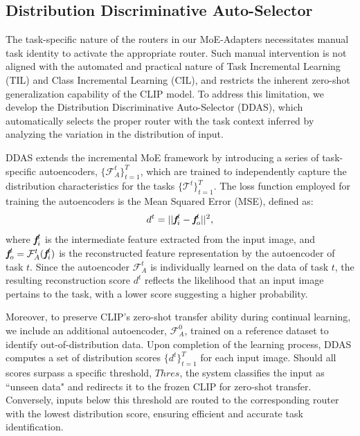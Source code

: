 \subsection{Distribution Discriminative Auto-Selector}
\label{DDAS}
The task-specific nature of the routers in our MoE-Adapters necessitates manual task identity to activate the appropriate router. Such manual intervention is not aligned with the automated and practical nature of Task Incremental Learning (TIL) and Class Incremental Learning (CIL), and restricts the inherent zero-shot generalization capability of the CLIP model. To address this limitation, we develop the Distribution Discriminative Auto-Selector (DDAS), which automatically selects the proper router with the task context inferred by analyzing the variation in the distribution of input.

DDAS extends the incremental MoE framework by introducing a series of task-specific autoencoders, $\{\mathcal{F}_A^t\}_{t=1}^T$, which are trained to independently capture the distribution characteristics for the tasks $\{{\mathcal{T}^t}\}_{t=1}^{T}$. The loss function employed for training the autoencoders is the Mean Squared Error (MSE), defined as:
\begin{equation}
     d^t= ||\textit{\textbf{f}}^t_i - \textit{\textbf{f}}^t_o||^2,
  \label{eq:chooseid1}
\end{equation}
where $\textit{\textbf{f}}^t_i$ is the intermediate feature extracted from the input image, and $\textit{\textbf{f}}^t_o=\mathcal{F}_A^t(\textit{\textbf{f}}^t_i)$ is the reconstructed feature representation by the autoencoder of task $t$. Since the autoencoder $\mathcal{F}_A^t$ is individually learned on the data of task $t$, the resulting reconstruction score $d^t$ reflects the likelihood that an input image pertains to the task, with a lower score suggesting a higher probability.

Moreover, to preserve CLIP's zero-shot transfer ability during continual learning, we include an additional autoencoder, $\mathcal{F}^0_A$, trained on a reference dataset to identify out-of-distribution data. Upon completion of the learning process, DDAS computes a set of distribution scores $\{d^t\}_{t=1}^T$ for each input image. Should all scores surpass a specific threshold, $Thres$, the system classifies the input as ``unseen data" and redirects it to the frozen CLIP for zero-shot transfer. Conversely, inputs below this threshold are routed to the corresponding router with the lowest distribution score, ensuring efficient and accurate task identification.

%  
